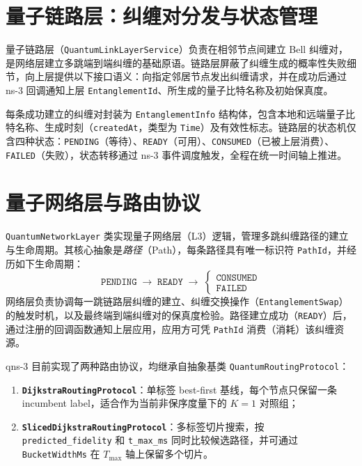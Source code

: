\section{量子链路层：纠缠对分发与状态管理}
\label{sec:link-layer}

量子链路层（\texttt{QuantumLinkLayerService}）负责在相邻节点间建立 Bell 纠缠对，是网络层建立多跳端到端纠缠的基础原语。链路层屏蔽了纠缠生成的概率性失败细节，向上层提供以下接口语义：向指定邻居节点发出纠缠请求，并在成功后通过 ns-3 回调通知上层 \texttt{EntanglementId}、所生成的量子比特名称及初始保真度。

每条成功建立的纠缠对封装为 \texttt{EntanglementInfo} 结构体，包含本地和远端量子比特名称、生成时刻（\texttt{createdAt}，类型为 \texttt{Time}）及有效性标志。链路层的状态机仅含四种状态：\texttt{PENDING}（等待）、\texttt{READY}（可用）、\texttt{CONSUMED}（已被上层消费）、\texttt{FAILED}（失败），状态转移通过 ns-3 事件调度触发，全程在统一时间轴上推进。

\section{量子网络层与路由协议}
\label{sec:net-layer}

\texttt{QuantumNetworkLayer} 类实现量子网络层（L3）逻辑，管理多跳纠缠路径的建立与生命周期。其核心抽象是\emph{路径}（Path），每条路径具有唯一标识符 \texttt{PathId}，并经历如下生命周期：
\begin{equation}
  \texttt{PENDING} \;\longrightarrow\; \texttt{READY} \;\longrightarrow\; \begin{cases} \texttt{CONSUMED} \\ \texttt{FAILED} \end{cases}
  \label{eq:path-lifecycle}
\end{equation}
网络层负责协调每一跳链路层纠缠的建立、纠缠交换操作（\texttt{EntanglementSwap}）的触发时机，以及最终端到端纠缠对的保真度检验。路径建立成功（\texttt{READY}）后，通过注册的回调函数通知上层应用，应用方可凭 \texttt{PathId} 消费（消耗）该纠缠资源。

qns-3 目前实现了两种路由协议，均继承自抽象基类 \texttt{QuantumRoutingProtocol}：
\begin{enumerate}
  \item \textbf{\texttt{DijkstraRoutingProtocol}}：单标签 best-first 基线，每个节点只保留一条 incumbent label，适合作为当前非保序度量下的 $K=1$ 对照组；
  \item \textbf{\texttt{SlicedDijkstraRoutingProtocol}}：多标签切片搜索，按 \texttt{predicted\_fidelity} 和 \texttt{t\_max\_ms} 同时比较候选路径，并可通过 \texttt{BucketWidthMs} 在 $T_{\max}$ 轴上保留多个切片。
\end{enumerate}

